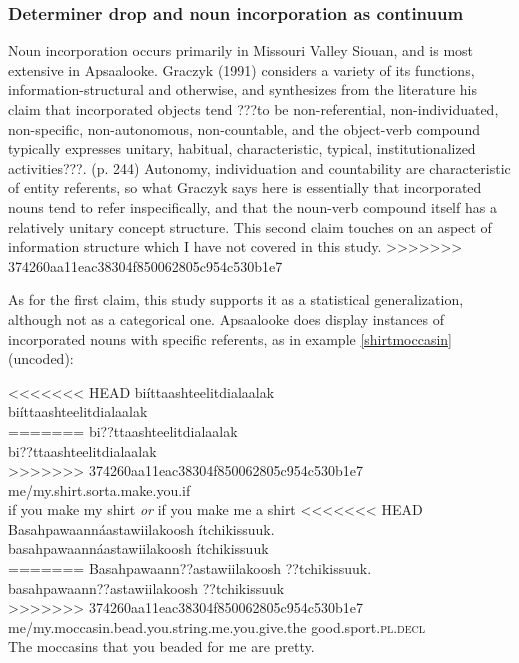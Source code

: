 \documentclass[output=paper]{LSP/langsci}
\begin{document}
\subsubsection{Determiner drop and noun incorporation as continuum}\label{dropincorp}

Noun incorporation occurs primarily in Missouri Valley Siouan, and is most extensive in Apsaalooke. Graczyk (1991) considers a variety of its functions, information-structural and otherwise, and synthesizes from the literature his claim that incorporated objects tend ???to be non-referential, non-individuated, non-specific, non-autonomous, non-countable, and the object-verb compound typically expresses unitary, habitual, characteristic, typical, institutionalized activities???. (p. 244) Autonomy, individuation and countability are characteristic of entity referents, so what Graczyk says here is essentially that incorporated nouns tend to refer inspecifically, and that the noun-verb compound itself has a relatively unitary concept structure. This second claim touches on an aspect of information structure which I have not covered in this study.
>>>>>>> 374260aa11eac38304f850062805c954c530b1e7

As for the first claim, this study supports it as a statistical generalization, although not as a categorical one. Apsaalooke does display instances of incorporated nouns with specific referents, as in example \ref{shirtmoccasin} (uncoded):

\ea\label{shirtmoccasin}
\ea\label{incorpshirt}
<<<<<<< HEAD
biíttaashteelitdialaalak\footnotemark\\
\gll	biíttaashteelitdialaalak\\
=======
bi??ttaashteelitdialaalak\footnotemark\\
\gll	bi??ttaashteelitdialaalak\\
>>>>>>> 374260aa11eac38304f850062805c954c530b1e7
	me/my.shirt.sorta.make.you.if\\
\glt	if you make my shirt \emph{or} if you make me a shirt
\ex\label{incorpmoccasin}
<<<<<<< HEAD
Basahpawaannáastawiilakoosh ítchikissuuk.\footnotemark\\
\gll	basahpawaannáastawiilakoosh					ítchikissuuk\\
=======
Basahpawaann??astawiilakoosh ??tchikissuuk.\footnotemark\\
\gll	basahpawaann??astawiilakoosh					??tchikissuuk\\
>>>>>>> 374260aa11eac38304f850062805c954c530b1e7
	me/my.moccasin.bead.you.string.me.you.give.the 		good.sport.\textsc{pl.decl}\\
\glt	The moccasins that you beaded for me are pretty. 
\z\z
\end{document}

